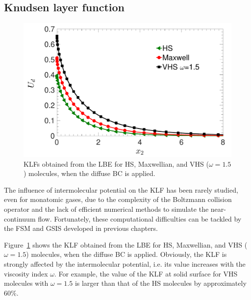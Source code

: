 \subsection{Knudsen layer function}
\begin{figure}[t]
	\centering
	\includegraphics[scale=0.3]{SlipJump/IMG/Knudsenlayer}
	\caption{\label{fig:Ud_potential}KLFs obtained from the LBE for HS, Maxwellian, and VHS ($\omega=1.5$) molecules, when the diffuse BC is applied.  }
\end{figure}

The influence of intermolecular potential on the KLF has been rarely studied, even for monatomic gases, due to the complexity of the Boltzmann collision operator and the lack of efficient numerical methods to simulate the near-continuum flow. Fortunately, these computational difficulties can be tackled by the FSM and GSIS developed in previous chapters. 


Figure~\ref{fig:Ud_potential} shows the KLF obtained from the LBE for HS, Maxwellian, and VHS ($\omega=1.5$) molecules, when the diffuse BC is applied. Obviously, the KLF is strongly affected by the intermolecular potential, i.e. its value increases with the viscosity index $\omega$. For example, the value of the KLF at solid surface for VHS molecules with $\omega=1.5$ is larger than that of the HS molecules by approximately $60\%$. 


